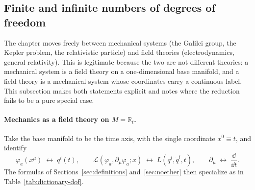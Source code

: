 %
%
\subsection{Finite and infinite numbers of degrees of freedom}
\label{sec:dof}

The chapter moves freely between mechanical systems (the Galilei group, the
Kepler problem, the relativistic particle) and field theories
(electrodynamics, general relativity). This is legitimate because the two are
not different theories: a mechanical system is a field theory on a
one-dimensional base manifold, and a field theory is a mechanical system whose
coordinates carry a continuous label. This subsection makes both statements
explicit and notes where the reduction fails to be a pure special case.

\paragraph{Mechanics as a field theory on $M=\mathbb R_t$.}
Take the base manifold to be the time axis, with the single coordinate
$x^0\equiv t$, and identify
\begin{equation}\label{eq:dictionary-id}
  \varphi_a(x^\mu)\;\leftrightarrow\;q^i(t),\qquad
  \mathcal L(\varphi_a,\partial_\mu\varphi_a;x)\;\leftrightarrow\;L(q^i,\dot q^i,t),\qquad
  \partial_\mu\;\leftrightarrow\;\frac{\dd}{\dd t}.
\end{equation}
The formulas of Sections~\ref{sec:definitions} and~\ref{sec:noether} then
specialize as in Table~\ref{tab:dictionary-dof}.

